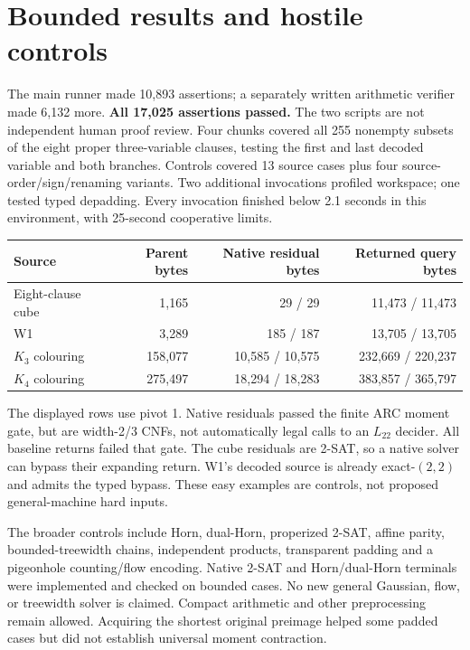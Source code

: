 \documentclass[11pt]{article}
\begin{document}
\section{Bounded results and hostile controls}
The main runner made 10,893 assertions; a separately written arithmetic
verifier made 6,132 more. \textbf{All 17,025 assertions passed.} The two scripts
are not independent human proof review. Four chunks covered all 255 nonempty
subsets of the eight proper three-variable clauses, testing the first and last
decoded variable and both branches. Controls covered 13 source cases plus
four source-order/sign/renaming variants. Two additional invocations profiled
workspace; one tested typed depadding. Every invocation finished below 2.1
seconds in this environment, with 25-second cooperative limits.

\begin{center}\small
\begin{tabular}{lrrr}\toprule
Source & Parent bytes & Native residual bytes & Returned query bytes\\\midrule
Eight-clause cube & 1,165 & 29 / 29 & 11,473 / 11,473\\
W1 & 3,289 & 185 / 187 & 13,705 / 13,705\\
$K_3$ colouring & 158,077 & 10,585 / 10,575 & 232,669 / 220,237\\
$K_4$ colouring & 275,497 & 18,294 / 18,283 & 383,857 / 365,797\\\bottomrule
\end{tabular}\end{center}
The displayed rows use pivot 1. Native residuals passed the finite ARC moment
gate, but are width-2/3 CNFs, not automatically legal calls to an $L_{22}$
decider. All baseline returns failed that gate. The cube residuals are 2-SAT,
so a native solver can bypass their expanding return. W1's decoded source is
already exact-$(2,2)$ and admits the typed bypass. These easy examples are
controls, not proposed general-machine hard inputs.

The broader controls include Horn, dual-Horn, properized 2-SAT, affine parity,
bounded-treewidth chains, independent products, transparent padding and a
pigeonhole counting/flow encoding. Native 2-SAT and Horn/dual-Horn terminals
were implemented and checked on bounded cases. No new general Gaussian,
flow, or treewidth solver is claimed. Compact arithmetic and other
preprocessing remain allowed. Acquiring the shortest original preimage helped
some padded cases but did not establish universal moment contraction.
\end{document}
